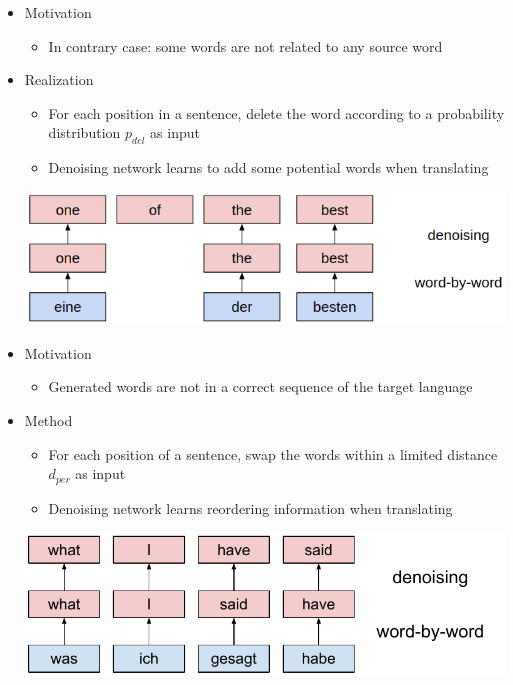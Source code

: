 \documentclass[11pt, a4paper, landscape]{article}
\begin{document}
\NewPage
{}
\begin{itemize}
	\item Motivation
	\begin{itemize}
		\item In contrary case: some words are not related to any source word
	\end{itemize}
	
	\item Realization
	\begin{itemize}
		\item For each position in a sentence, delete the word according to a probability distribution ${p_{del}}$ as input
		\item  Denoising network learns to add some potential words when translating
	\end{itemize}	
	\begin{center}
		\vspace{0.5em}
		\hspace{-1cm}\includegraphics[width=0.8\linewidth]{deletion}
	\end{center}\vspace{0.5em}	
\end{itemize}

\NewPage
{}	
\begin{itemize}
	\item Motivation
	\begin{itemize}
		\item Generated words are not in a correct sequence of the target language
	\end{itemize}
	\item Method
	\begin{itemize}
		\item For each position of a sentence, swap the words within a limited distance $d_{per}$ as input
		\item Denoising network learns reordering information when translating
	\end{itemize}
	\begin{center}
		\vspace{0.5em}
		\hspace{-1cm}\includegraphics[width=0.8\linewidth]{denoising}
	\end{center}\vspace{0.5em}
\end{itemize}	
\end{document}
